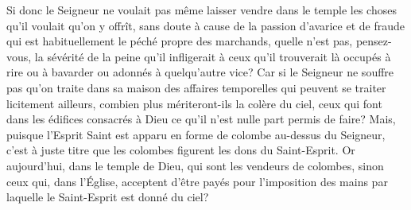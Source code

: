 Si donc le Seigneur ne voulait pas même laisser vendre dans le temple
	les choses qu’il voulait qu’on y offrît,
	sans doute à cause de la passion d’avarice et de fraude
		qui est habituellement le péché propre des marchands,
	quelle n’est pas, pensez-vous, la sévérité de la peine qu’il infligerait
	à ceux qu’il trouverait là occupés à rire ou à bavarder
		ou adonnés à quelqu’autre vice?
Car si le Seigneur ne souffre pas
		qu’on traite dans sa maison des affaires temporelles
	qui peuvent se traiter licitement ailleurs,
	combien plus mériteront-ils la colère du ciel,
	ceux qui font dans les édifices consacrés à Dieu
		ce qu’il n’est nulle part permis de faire?
Mais, puisque l’Esprit Saint
		est apparu en forme de colombe au-dessus du Seigneur,
	c’est à juste titre que les colombes figurent les dons du Saint-Esprit.
Or aujourd’hui, dans le temple de Dieu, qui sont les vendeurs de colombes,
	sinon ceux qui, dans l’Église, acceptent d’être payés
	pour l’imposition des mains par laquelle le Saint-Esprit est donné du ciel?
